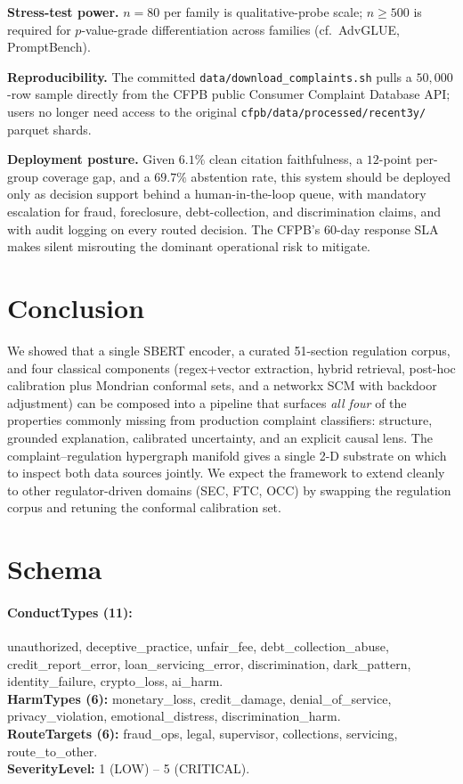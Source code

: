 \documentclass[11pt]{article}
\begin{document}
\textbf{Stress-test power.} $n=80$ per family is qualitative-probe scale;
$n\!\geq\!500$ is required for $p$-value-grade differentiation across
families (cf.\ AdvGLUE, PromptBench).

\textbf{Reproducibility.} The committed \texttt{data/download\_complaints.sh}
pulls a $50{,}000$-row sample directly from the CFPB public Consumer
Complaint Database API; users no longer need access to the original
\texttt{cfpb/data/processed/recent3y/} parquet shards.

\textbf{Deployment posture.} Given $6.1\%$ clean citation faithfulness, a
$12$-point per-group coverage gap, and a $69.7\%$ abstention rate, this
system should be deployed only as decision support behind a human-in-the-loop
queue, with mandatory escalation for fraud, foreclosure, debt-collection,
and discrimination claims, and with audit logging on every routed
decision. The CFPB's 60-day response SLA makes silent misrouting the
dominant operational risk to mitigate.

\section{Conclusion}\label{sec:conclusion}

We showed that a single SBERT encoder, a curated 51-section regulation
corpus, and four classical components (regex+vector extraction, hybrid
retrieval, post-hoc calibration plus Mondrian conformal sets, and a
networkx SCM with backdoor adjustment) can be composed into a pipeline that
surfaces \emph{all four} of the properties commonly missing from production
complaint classifiers: structure, grounded explanation, calibrated
uncertainty, and an explicit causal lens. The complaint--regulation
hypergraph manifold gives a single 2-D substrate on which to inspect both
data sources jointly. We expect the framework to extend cleanly to other
regulator-driven domains (SEC, FTC, OCC) by swapping the regulation corpus
and retuning the conformal calibration set.

\appendix
\section{Schema}\label{app:schema}

\begin{sloppypar}
\paragraph{ConductTypes (11):} unauthorized, deceptive\_practice,
unfair\_fee, debt\_collection\_abuse, credit\_report\_error,
loan\_servicing\_error, discrimination, dark\_pattern, identity\_failure,
crypto\_loss, ai\_harm.\\
\textbf{HarmTypes (6):} monetary\_loss, credit\_damage, denial\_of\_service,
privacy\_violation, emotional\_distress, discrimination\_harm.\\
\textbf{RouteTargets (6):} fraud\_ops, legal, supervisor, collections,
servicing, route\_to\_other.\\
\textbf{SeverityLevel:} 1 (LOW) -- 5 (CRITICAL).
\end{sloppypar}
\end{document}
